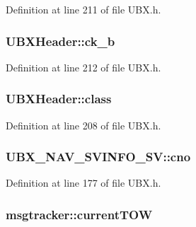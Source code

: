 Definition at line 211 of file U\-B\-X.\-h.

\hypertarget{group___g_s_p_module_ga5fe662d32012b4caaca9b027df4a3d30}{
\subsubsection[{ck\-\_\-b}]{ U\-B\-X\-Header\-::ck\-\_\-b}}\label{group___g_s_p_module_ga5fe662d32012b4caaca9b027df4a3d30}


Definition at line 212 of file U\-B\-X.\-h.

\hypertarget{group___g_s_p_module_gab7410b764b3d80030e5a8e5167831303}{
\subsubsection[{class}]{ U\-B\-X\-Header\-::class}}\label{group___g_s_p_module_gab7410b764b3d80030e5a8e5167831303}


Definition at line 208 of file U\-B\-X.\-h.

\hypertarget{group___g_s_p_module_ga05f735590e6c4aaa53746a4756695b09}{
\subsubsection[{cno}]{ U\-B\-X\-\_\-\-N\-A\-V\-\_\-\-S\-V\-I\-N\-F\-O\-\_\-\-S\-V\-::cno}}\label{group___g_s_p_module_ga05f735590e6c4aaa53746a4756695b09}


Definition at line 177 of file U\-B\-X.\-h.

\hypertarget{group___g_s_p_module_ga65347628b901bdb3bc14c6a88f5f9871}{
\subsubsection[{current\-T\-O\-W}]{ msgtracker\-::current\-T\-O\-W}}\label{group___g_s_p_module_ga65347628b901bdb3bc14c6a88f5f9871}



